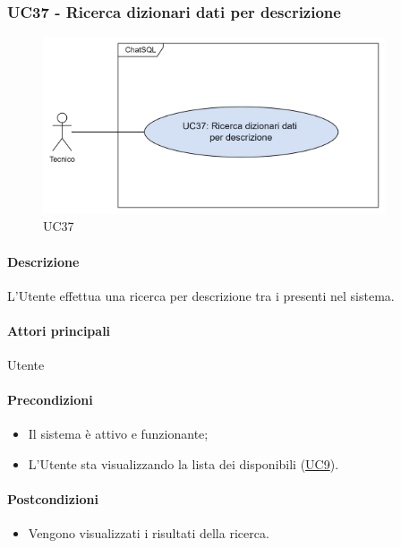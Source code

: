 \subsubsection{UC37 - Ricerca dizionari dati per descrizione}\label{UC37}

\begin{figure}[H]
  \centering
  \includegraphics[width=0.90\textwidth]{assets/uc37.png}
  \caption{UC37}
\end{figure}

\paragraph*{Descrizione}
L'Utente effettua una ricerca per descrizione tra i  presenti nel sistema.

\paragraph*{Attori principali}
Utente

\paragraph*{Precondizioni}
\begin{itemize}
  \item Il sistema è attivo e funzionante;
  \item L'Utente sta visualizzando la lista dei  disponibili (\hyperref[UC9]{UC9}).
\end{itemize}

\paragraph*{Postcondizioni}
\begin{itemize}
  \item Vengono visualizzati i risultati della ricerca.
\end{itemize}

